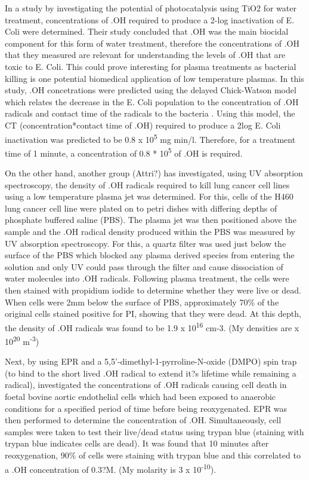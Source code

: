 \documentclass[11pt, oneside]{article}   	%
\begin{document}
In a study by \cite{Cho2004} investigating the potential of photocatalysis using TiO2 for water treatment, concentrations of .OH required to produce a 2-log inactivation of E. Coli were determined. Their study concluded that .OH was the main biocidal component for this form of water treatment, therefore the concentrations of .OH that they measured are relevant for understanding the levels of .OH that are toxic to E. Coli. This could prove interesting for plasma treatments as bacterial killing is one potential biomedical application of low temperature plasmas. 
In this study, .OH concetrations were predicted using the delayed Chick-Watson model which relates the decrease in the E. Coli population to the concentration of .OH radicals and contact time of the radicals to the bacteria \cite{Cho2003}. Using this model, the CT (concentration*contact time of .OH) required to produce a 2log E. Coli inactivation was predicted to be 0.8 x 10\textsuperscript{5} mg min/l.  Therefore, for a treatment time of 1 minute, a concentration of 0.8 * 10\textsuperscript{5} of .OH is required. 

On the other hand, another group (Attri?) has investigated, using UV absorption spectroscopy, the density of .OH radicals required to kill lung cancer cell lines using a low temperature plasma jet was determined. For this, cells of the H460 lung cancer cell line were plated on to petri dishes with differing depths of phosphate buffered saline (PBS). The plasma jet was then positioned above the sample and the .OH radical density produced within the PBS was measured by UV absorption spectroscopy. For this, a quartz filter was used just below the surface of the PBS which blocked any plasma derived species from entering the solution and only UV could pass through the filter and cause dissociation of water molecules into .OH radicals. Following plasma treatment, the cells were then stained with propidium iodide to determine whether they were live or dead. When cells were 2mm below the surface of PBS, approximately 70\% of the original cells stained positive for PI, showing that they were dead.  At this depth, the density of .OH radicals was found to be 1.9 x 10\textsuperscript{16} cm-3.  (My densities are x 10\textsuperscript{20} m\textsuperscript{-3})

Next, by using EPR and a 5,5'-dimethyl-1-pyrroline-N-oxide (DMPO) spin trap (to bind to the short lived .OH radical to extend it?s lifetime while remaining a radical), \cite{Zweier1988} investigated the concentrations of .OH radicals causing cell death in foetal bovine aortic endothelial cells which had been exposed to anaerobic conditions for a specified period of time before being reoxygenated. EPR was then performed to determine the concentration of .OH. Simultaneously, cell samples were taken to test their live/dead status using trypan blue (staining with trypan blue indicates cells are dead). It was found that 10 minutes after reoxygenation, 90\% of cells were staining with trypan blue and this correlated to a .OH concentration of 0.3?M. (My molarity is 3 x 10\textsuperscript{-10}).
\end{document}
